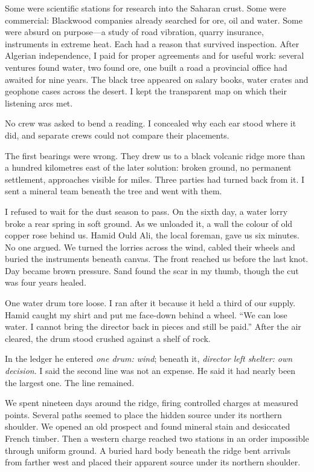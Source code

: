 Some were scientific stations for research into the Saharan crust. Some were commercial: Blackwood companies already searched for ore, oil and water. Some were absurd on purpose—a study of road vibration, quarry insurance, instruments in extreme heat. Each had a reason that survived inspection. After Algerian independence, I paid for proper agreements and for useful work: several ventures found water, two found ore, one built a road a provincial office had awaited for nine years. The black tree appeared on salary books, water crates and geophone cases across the desert. I kept the transparent map on which their listening arcs met.\par

No crew was asked to bend a reading. I concealed why each ear stood where it did, and separate crews could not compare their placements.\par

The first bearings were wrong. They drew us to a black volcanic ridge more than a hundred kilometres east of the later solution: broken ground, no permanent settlement, approaches visible for miles. Three parties had turned back from it. I sent a mineral team beneath the tree and went with them.\par

I refused to wait for the dust season to pass. On the sixth day, a water lorry broke a rear spring in soft ground. As we unloaded it, a wall the colour of old copper rose behind us. Hamid Ould Ali, the local foreman, gave us six minutes. No one argued. We turned the lorries across the wind, cabled their wheels and buried the instruments beneath canvas. The front reached us before the last knot. Day became brown pressure. Sand found the scar in my thumb, though the cut was four years healed.\par

One water drum tore loose. I ran after it because it held a third of our supply. Hamid caught my shirt and put me face-down behind a wheel. “We can lose water. I cannot bring the director back in pieces and still be paid.” After the air cleared, the drum stood crushed against a shelf of rock.\par

In the ledger he entered \emph{one drum: wind}; beneath it, \emph{director left shelter: own decision}. I said the second line was not an expense. He said it had nearly been the largest one. The line remained.\par

We spent nineteen days around the ridge, firing controlled charges at measured points. Several paths seemed to place the hidden source under its northern shoulder. We opened an old prospect and found mineral stain and desiccated French timber. Then a western charge reached two stations in an order impossible through uniform ground. A buried hard body beneath the ridge bent arrivals from farther west and placed their apparent source under its northern shoulder.\par

